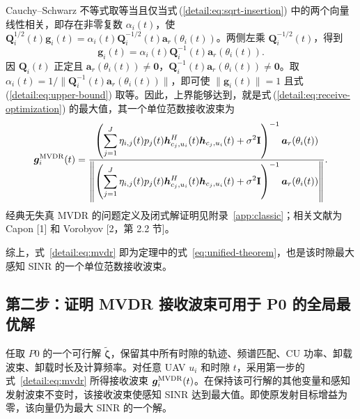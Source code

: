 \documentclass[11pt,a4paper]{ctexart}
\begin{document}
Cauchy--Schwarz 不等式取等当且仅当式\,(\ref{detail:eq:sqrt-insertion}) 中的两个向量线性相关，即存在非零复数 $\alpha_i(t)$，使 $\mathbf Q_i^{1/2}(t)\bm g_i(t)=\alpha_i(t)\mathbf Q_i^{-1/2}(t)\bm a_r(\theta_i(t))$。两侧左乘 $\mathbf Q_i^{-1/2}(t)$，得到
\begin{equation}\label{detail:eq:direction}
\bm g_i(t)=\alpha_i(t)\mathbf Q_i^{-1}(t)\bm a_r(\theta_i(t)).
\end{equation}
因 $\mathbf Q_i(t)$ 正定且 $\bm a_r(\theta_i(t))\ne\bm0$，$\mathbf Q_i^{-1}(t)\bm a_r(\theta_i(t))\ne\bm0$。取 $\alpha_i(t)=1/\|\mathbf Q_i^{-1}(t)\bm a_r(\theta_i(t))\|$，即可使 $\|\bm g_i(t)\|=1$ 且式\,(\ref{detail:eq:upper-bound}) 取等。因此，上界能够达到，就是式\,(\ref{detail:eq:receive-optimization}) 的最大值，其一个单位范数接收波束为
\begin{equation}\label{detail:eq:mvdr}
\bm g_i^{\rm MVDR}(t)=
\frac{\left(\displaystyle\sum_{j=1}^J\eta_{i,j}(t)p_j(t)
\bm h_{c_j,u_i}^{H}(t)\bm h_{c_j,u_i}(t)+\sigma^2\mathbf I\right)^{-1}
\bm a_r(\theta_i(t))}
{\left\|\left(\displaystyle\sum_{j=1}^J\eta_{i,j}(t)p_j(t)
\bm h_{c_j,u_i}^{H}(t)\bm h_{c_j,u_i}(t)+\sigma^2\mathbf I\right)^{-1}
\bm a_r(\theta_i(t))\right\|}.
\end{equation}
经典无失真 MVDR 的问题定义及闭式解证明见附录~\ref{app:classic}；相关文献为 Capon [1] 和 Vorobyov [2，第 2.2 节]。




综上，式~\eqref{detail:eq:mvdr} 即为定理中的式~\eqref{eq:unified-theorem}，也是该时隙最大感知 SINR 的一个单位范数接收波束。



\subsection{第二步：证明 MVDR 接收波束可用于 P0 的全局最优解}

任取 $P0$ 的一个可行解 $\tilde{\bm\zeta}$，保留其中所有时隙的轨迹、频谱匹配、CU 功率、卸载波束、卸载时长及计算频率。对任意 UAV $u_i$ 和时隙 $t$，采用第一步的式~\eqref{detail:eq:mvdr} 所得接收波束 $\bm g_i^{\rm MVDR}(t)$。在保持该可行解的其他变量和感知发射波束不变时，该接收波束使感知 SINR 达到最大值。即使原发射目标增益为零，该向量仍为最大 SINR 的一个解。
\end{document}
